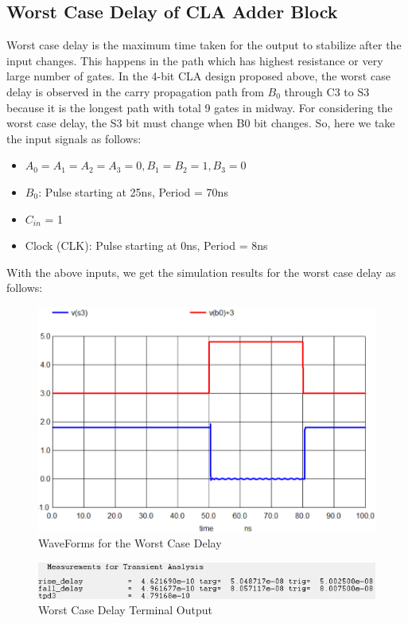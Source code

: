 \documentclass[conference]{IEEEtran}
\begin{document}
\subsection{Worst Case Delay of CLA Adder Block}
Worst case delay is the maximum time taken for the output to stabilize after the input changes. This happens in the path which has highest resistance or very large number of gates. In the 4-bit CLA design proposed above, the worst case delay is observed in the carry propagation path from  $B_0$ through C3 to S3 because it is the longest path with total 9 gates in midway. 
For considering the worst case delay, the S3 bit must change when B0 bit changes. So, here we take the input signals as follows:
\begin{itemize}
    \item $A_0 = A_1 = A_2 = A_3 = 0, B_1 = B_2 = 1, B_3 = 0$
    \item $B_0$: Pulse starting at 25ns, Period = 70ns
    \item $C_{in}$ = 1
    \item Clock (CLK): Pulse starting at 0ns, Period = 8ns
\end{itemize}

With the above inputs, we get the simulation results for the worst case delay as follows:
\begin{figure}[H]
    \centering
    \includegraphics[width=1\linewidth]{clapreworst.png}
    \caption{WaveForms for the Worst Case Delay}
    \label{fig:worst_case_delay}
\end{figure}

\begin{figure}[H]
    \centering
    \includegraphics[width=1\linewidth]{clapreworstterm.png}
    \caption{Worst Case Delay Terminal Output}
    \label{fig:worst_case_delay}
\end{figure}
\end{document}
